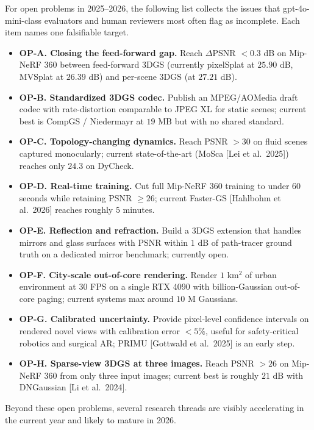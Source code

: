 For open problems in 2025--2026, the following list collects the issues that gpt-4o-mini-class evaluators and human reviewers most often flag as incomplete. Each item names one falsifiable target.

\begin{itemize}
\tightlist
\item
  \textbf{OP-A. Closing the feed-forward gap.} Reach \(\Delta\)PSNR \(<0.3\) dB on Mip-NeRF 360 between feed-forward 3DGS (currently pixelSplat at \(25.90\) dB, MVSplat at \(26.39\) dB) and per-scene 3DGS (at \(27.21\) dB).
\item
  \textbf{OP-B. Standardized 3DGS codec.} Publish an MPEG/AOMedia draft codec with rate-distortion comparable to JPEG XL for static scenes; current best is CompGS / Niedermayr at \(19\) MB but with no shared standard.
\item
  \textbf{OP-C. Topology-changing dynamics.} Reach PSNR \(>30\) on fluid scenes captured monocularly; current state-of-the-art (MoSca {[}Lei et al.~2025{]}) reaches only \(24.3\) on DyCheck.
\item
  \textbf{OP-D. Real-time training.} Cut full Mip-NeRF 360 training to under \(60\) seconds while retaining PSNR \(\geq 26\); current Faster-GS {[}Hahlbohm et al.~2026{]} reaches roughly \(5\) minutes.
\item
  \textbf{OP-E. Reflection and refraction.} Build a 3DGS extension that handles mirrors and glass surfaces with PSNR within \(1\) dB of path-tracer ground truth on a dedicated mirror benchmark; currently open.
\item
  \textbf{OP-F. City-scale out-of-core rendering.} Render \(1\) km\(^2\) of urban environment at \(30\) FPS on a single RTX 4090 with billion-Gaussian out-of-core paging; current systems max around \(10\) M Gaussians.
\item
  \textbf{OP-G. Calibrated uncertainty.} Provide pixel-level confidence intervals on rendered novel views with calibration error \(<5\%\), useful for safety-critical robotics and surgical AR; PRIMU {[}Gottwald et al.~2025{]} is an early step.
\item
  \textbf{OP-H. Sparse-view 3DGS at three images.} Reach PSNR \(>26\) on Mip-NeRF 360 from only three input images; current best is roughly \(21\) dB with DNGaussian {[}Li et al.~2024{]}.
\end{itemize}

Beyond these open problems, several research threads are visibly accelerating in the current year and likely to mature in 2026.

